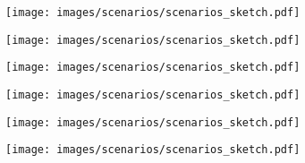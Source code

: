 \begin{subfigure}[b]{0.2\textwidth}
    \centering
    \texttt{[image: images/scenarios/scenarios\_sketch.pdf]}
    \caption{}
    \label{fig:s1}
\end{subfigure}
\hfill
\begin{subfigure}[b]{0.2\textwidth}
    \centering
    \texttt{[image: images/scenarios/scenarios\_sketch.pdf]}
    \caption{}
    \label{fig:s2}
\end{subfigure}
    \hfill
\begin{subfigure}[b]{0.2\textwidth}
    \centering
    \texttt{[image: images/scenarios/scenarios\_sketch.pdf]}
    \caption{}
    \label{fig:s3}
\end{subfigure}
     \hfill
\begin{subfigure}[b]{0.2\textwidth}
    \centering
    \texttt{[image: images/scenarios/scenarios\_sketch.pdf]}
    \caption{}
    \label{fig:s4}
\end{subfigure}
    \hfill
\begin{subfigure}[b]{0.2\textwidth}
    \centering
    \texttt{[image: images/scenarios/scenarios\_sketch.pdf]}
    \caption{}
    \label{fig:s5}
\end{subfigure}
     \hfill
\begin{subfigure}[b]{0.2\textwidth}
    \centering
    \texttt{[image: images/scenarios/scenarios\_sketch.pdf]}
    \caption{}
    \label{fig:s6}
\end{subfigure}


